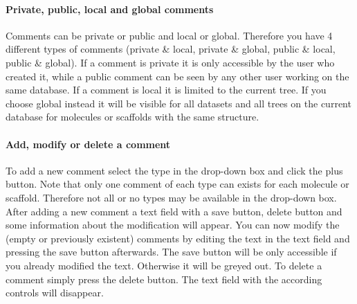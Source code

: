 \paragraph{Private, public, local and global comments}
Comments can be private or public and local or global. Therefore you have 4 different types of comments (private \& local, private \& global, public \& local, public \& global). If a comment is private it is only accessible by the user who created it, while a public comment can be seen by any other user working on the same database. If a comment is local it is limited to the current tree. If you choose global instead it will be visible for all datasets and all trees on the current database for molecules or scaffolds with the same structure.

\paragraph{Add, modify or delete a comment}
To add a new comment select the type in the drop-down box and click the plus button. Note that only one comment of each type can exists for each molecule or scaffold. Therefore not all or no types may be available in the drop-down box. After adding a new comment a text field with a save button, delete button and some information about the modification will appear. You can now modify the (empty or previously existent) comments by editing the text in the text field and pressing the save button afterwards. The save button will be only accessible if you already modified the text. Otherwise it will be greyed out. To delete a comment simply press the delete button. The text field with the according controls will disappear.
